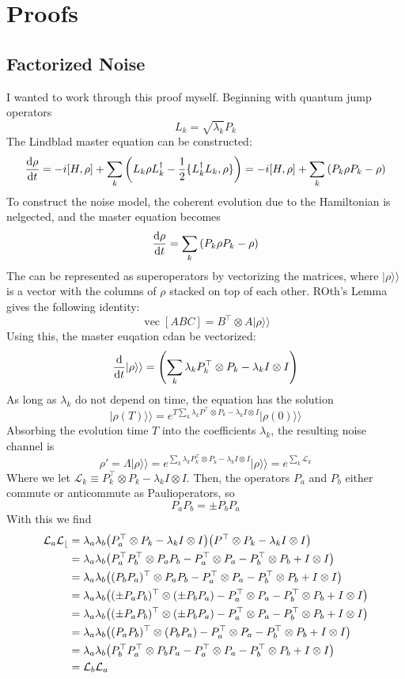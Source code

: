 \documentclass[11pt]{article}
\newcommand{\vectorize}[1]{\operatorname{vec}\left[#1\right]}
\newcommand{\kket}[1]{\vert #1 \rangle  \rangle}
\begin{document}
\section*{Proofs}
\subsection*{Factorized Noise}
I wanted to work through this proof myself. Beginning with quantum jump operators
$$
L_k = \sqrt{\lambda_k}P_k
$$
The Lindblad master equation can be constructed:
$$
\dv{\rho}{t} = -i[H, \rho]+\sum_k\qty(L_k \rho L_k^\dagger - \frac{1}{2}\{L_k^\dagger L_k, \rho\}) = -i[H, \rho]+\sum_k \qty(P_k \rho P_k - \rho)
$$
To construct the noise model, the coherent evolution due to the Hamiltonian is nelgected, and the master equation becomes
$$
\dv{\rho}{t} = \sum_k \qty(P_k \rho P_k - \rho)
$$
The can be represented as superoperators by vectorizing the matrices, where $\kket{\rho}$ is a vector with the columns of $\rho$ stacked on top of each other. ROth's Lemma gives the following identity:
$$
\vectorize{ABC} = B^\top \otimes A \kket{\rho}
$$
Using this, the master euqation cdan be vectorized:
$$
\dv{t}\kket{\rho} = \qty(\sum_k \lambda_kP_k^\top \otimes P_k - \lambda_kI\otimes I)
$$
As long as $\lambda_k$ do not depend on time, the equation has the solution
$$
\kket{\rho(T)} = e^{T\sum_k\lambda_kP^\top \otimes P_k -\lambda_k I\otimes I}\kket{\rho(0)}
$$
Absorbing the evolution time $T$ into the coefficients $\lambda_k$, the resulting noise channel is
$$
 \rho' = \Lambda\kket{\rho} = e^{\sum_k\lambda_kP_k^\top \otimes P_k -\lambda_k I\otimes I} \kket{\rho} = e^{\sum_k \mathcal{L}_k }
$$
Where we let $\mathcal{L}_k \equiv P_k^\top \otimes P_k -\lambda_k I\otimes I$. Then, the operators $P_a$ and $P_b$ either commute or anticommute as Paulioperators, so
$$
P_aP_b = \pm P_bP_a
$$
With this we find
\begin{align*}
    \mathcal{L}_a\mathcal{L_b} &= \lambda_a\lambda_b\qty(P_a^\top \otimes P_k -\lambda_k I\otimes I)\qty(P^\top \otimes P_k -\lambda_k I\otimes I)\\
                               &= \lambda_a \lambda_b\qty(P_a^\top P_b^\top\otimes P_a P_b-P_a^\top \otimes P_a - P_b^\top \otimes P_b + I \otimes I)\\
                               &= \lambda_a \lambda_b\qty((P_bP_a)^\top\otimes P_a P_b-P_a^\top \otimes P_a - P_b^\top \otimes P_b + I \otimes I)\\
                               &= \lambda_a \lambda_b\qty((\pm P_aP_b)^\top\otimes (\pm P_b P_a)-P_a^\top \otimes P_a - P_b^\top \otimes P_b + I \otimes I)\\
                               &= \lambda_a \lambda_b\qty((\pm P_aP_b)^\top\otimes (\pm P_b P_a)-P_a^\top \otimes P_a - P_b^\top \otimes P_b + I \otimes I)\\
                               &= \lambda_a \lambda_b\qty((P_aP_b)^\top\otimes (P_b P_a)-P_a^\top \otimes P_a - P_b^\top \otimes P_b + I \otimes I)\\
                               &= \lambda_a \lambda_b\qty(P_b^\top P_a^\top\otimes P_b P_a-P_a^\top \otimes P_a - P_b^\top \otimes P_b + I \otimes I)\\
                               &= \mathcal{L}_b \mathcal{L}_a
\end{align*}
\end{document}
